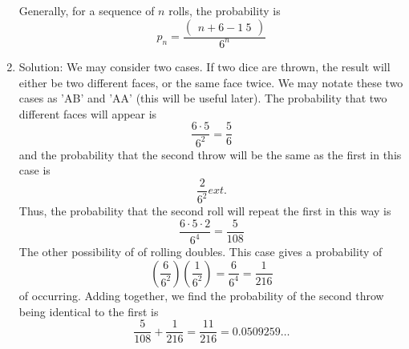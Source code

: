\begin{enumerate}
Generally, for a sequence of $n$ rolls, the probability is
$$
p_n=\frac{\left(\begin{array}{c}
n+6-1 \
5
\end{array}\right)}{6^n}
$$


\item
Solution: We may consider two cases. If two dice are thrown, the result will either be two different faces, or the same face twice. We may notate these two cases as 'AB' and 'AA' (this will be useful later). The probability that two different faces will appear is
$$
\frac{6 \cdot 5}{6^2}=\frac{5}{6}
$$
and the probability that the second throw will be the same as the first in this case is
$$
\frac{2}{6^2} 	ext {. }
$$
Thus, the probability that the second roll will repeat the first in this way is
$$
\frac{6 \cdot 5 \cdot 2}{6^4}=\frac{5}{108}
$$
The other possibility of of rolling doubles. This case gives a probability of
$$
\left(\frac{6}{6^2}\right)\left(\frac{1}{6^2}\right)=\frac{6}{6^4}=\frac{1}{216}
$$
of occurring. Adding together, we find the probability of the second throw being identical to the first is
$$
\frac{5}{108}+\frac{1}{216}=\frac{11}{216}=0.0509259 \ldots
$$

\end{enumerate}
